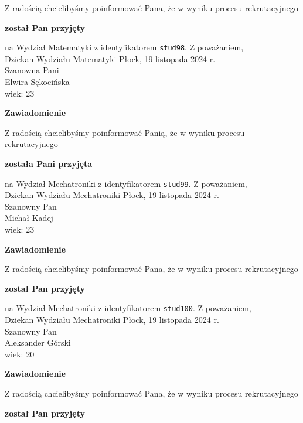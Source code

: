 \documentclass[12pt,a4paper]{article}
\begin{document}
\bigskip 
Z radością chcielibyśmy poinformować Pana, że w wyniku procesu rekrutacyjnego
\begin{center}
\textsf{\textbf{został Pan przyjęty}}
\end{center}
na Wydział Matematyki z identyfikatorem \verb|stud98|. 
\vspace{2cm}
\noindent
Z poważaniem, \\
Dziekan
Wydziału Matematyki
\newpage
\hfill Płock, 19 listopada 2024 r. \\
\noindent
Szanowna Pani \\
Elwira Sękocińska \\
wiek: 23
\bigskip
\begin{center}
    {\Large\textbf{Zawiadomienie}}
\end{center}
\bigskip 
Z radością chcielibyśmy poinformować Panią, że w wyniku procesu rekrutacyjnego
\begin{center}
\textsf{\textbf{została Pani przyjęta}}
\end{center}
na Wydział Mechatroniki z identyfikatorem \verb|stud99|. 
\vspace{2cm}
\noindent
Z poważaniem, \\
Dziekan
Wydziału Mechatroniki
\newpage
\hfill Płock, 19 listopada 2024 r. \\
\noindent
Szanowny Pan \\
Michał Kadej \\
wiek: 23
\bigskip
\begin{center}
    {\Large\textbf{Zawiadomienie}}
\end{center}
\bigskip 
Z radością chcielibyśmy poinformować Pana, że w wyniku procesu rekrutacyjnego
\begin{center}
\textsf{\textbf{został Pan przyjęty}}
\end{center}
na Wydział Mechatroniki z identyfikatorem \verb|stud100|. 
\vspace{2cm}
\noindent
Z poważaniem, \\
Dziekan
Wydziału Mechatroniki
\newpage
\hfill Płock, 19 listopada 2024 r. \\
\noindent
Szanowny Pan \\
Aleksander Górski \\
wiek: 20
\bigskip
\begin{center}
    {\Large\textbf{Zawiadomienie}}
\end{center}
\bigskip 
Z radością chcielibyśmy poinformować Pana, że w wyniku procesu rekrutacyjnego
\begin{center}
\textsf{\textbf{został Pan przyjęty}}
\end{center}
\end{document}
